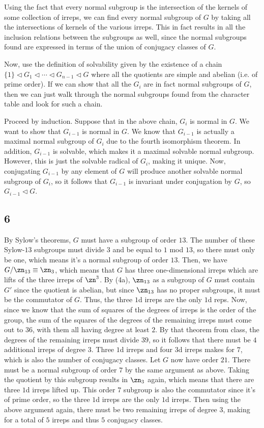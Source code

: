 \documentclass{article}
\begin{document}
Using the fact that every normal subgroup is the intersection of the kernels of some collection of irreps, we can find every normal subgroup of $G$ by taking all the intersections of kernels of the various irreps. This in fact results in all the inclusion relations between the subgroups as well, since the normal subgroups found are expressed in terms of the union of conjugacy classes of $G$.

Now, use the definition of solvability given by the existence of a chain $\{1\}\triangleleft G_1\triangleleft\cdots\triangleleft G_{n-1}\triangleleft G$ where all the quotients are simple and abelian (i.e. of prime order). If we can show that all the $G_i$ are in fact normal subgroups of $G$, then we can just walk through the normal subgroups found from the character table and look for such a chain. 

Proceed by induction. Suppose that in the above chain, $G_i$ is normal in $G$. We want to show that $G_{i-1}$ is normal in $G$. We know that $G_{i-1}$ is actually a maximal normal subgroup of $G_i$ due to the fourth isomorphism theorem. In addition, $G_{i-1}$ is solvable, which makes it a maximal solvable normal subgroup. However, this is just the solvable radical of $G_i$, making it unique. Now, conjugating $G_{i-1}$ by any element of $G$ will produce another solvable normal subgroup of $G_i$, so it follows that $G_{i-1}$ is invariant under conjugation by $G$, so $G_{i-1}\triangleleft G$.
\subsection*{6}
By Sylow's theorems, $G$ must have a subgroup of order $13$. The number of these Sylow-$13$ subgroups must divide $3$ and be equal to $1$ mod $13$, so there must only be one, which means it's a normal subgroup of order $13$. Then, we have $G/\zn_{13}\equiv\zn_3$, which means that $G$ has three one-dimensional irreps which are lifts of the three irreps of $\zn^3$. By (4a), $\zn_{13}$ as a subgroup of $G$ must contain $G'$ since the quotient is abelian, but since $\zn_{13}$ has no proper subgroups, it must be the commutator of $G$. Thus, the three $1$d irreps are the only $1$d reps. Now, since we know that the sum of squares of the degrees of irreps is the order of the group, the sum of the squares of the degrees of the remaining irreps must come out to $36$, with them all having degree at least $2$. By that theorem from class, the degrees of the remaining irreps must divide $39$, so it follows that there must be $4$ additional irreps of degree $3$.
Three $1$d irreps and four $3$d irreps makes for $7$, which is also the number of conjugacy classes.
Let $G$ now have order $21$. There must be a normal subgroup of order $7$ by the same argument as above. Taking the quotient by this subgroup results in $\zn_3$ again, which means that there are three $1$d irreps lifted up. This order $7$ subgroup is also the commutator since it's of prime order, so the three $1$d irreps are the only $1$d irreps. Then using the above argument again, there must be two remaining irreps of degree $3$, making for a total of $5$ irreps and thus $5$ conjugacy classes.
\end{document}
